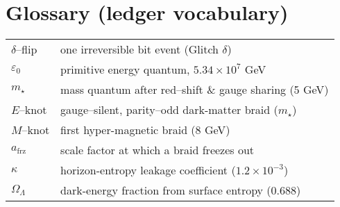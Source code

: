 \section*{Glossary (ledger vocabulary)}
\begin{tabular}{ll}
$\delta$--flip  & one irreversible bit event (Glitch $\delta$)\\
$\varepsilon_{0}$ & primitive energy quantum, $5.34\times10^{7}$ GeV\\
$m_\star$ & mass quantum after red–shift \& gauge sharing (5 GeV)\\
$E$–knot & gauge–silent, parity–odd dark-matter braid ($m_\star$)\\
$M$–knot & first hyper-magnetic braid (8 GeV)\\
$a_\text{frz}$ & scale factor at which a braid freezes out\\
$\kappa$ & horizon-entropy leakage coefficient ($1.2\times10^{-3}$)\\
$\Omega_{\Lambda}$ & dark-energy fraction from surface entropy ($0.688$)\\
\end{tabular}
\clearpage 